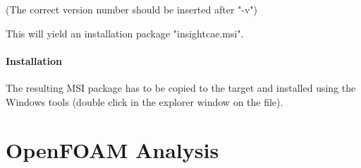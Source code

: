 (The correct version number should be inserted after "-v")

This will yield an installation package "insightcae.msi".

\paragraph{Installation}

The resulting MSI package has to be copied to the target and installed using the Windows tools (double click in the explorer window on the file).

\section{OpenFOAM Analysis}

%
%
